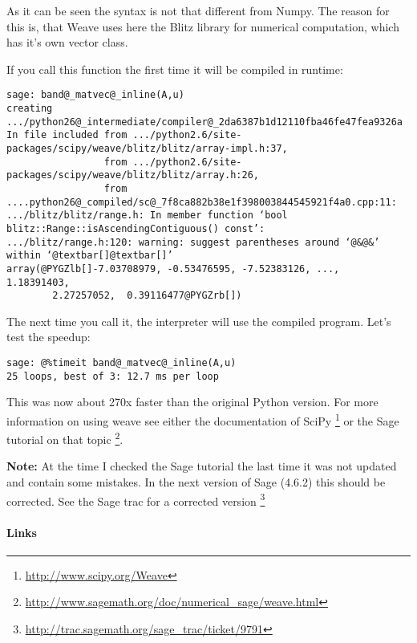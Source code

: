 \documentclass[letterpaper,10pt,english]{manual}
\begin{document}
As it can be seen the syntax is not that different from Numpy. The
reason for this is, that Weave uses here the Blitz library for
numerical computation, which has it's own vector class.

If you call this function the first time it will be compiled in
runtime:

\begin{Verbatim}[commandchars=@\[\]]
sage: band@_matvec@_inline(A,u)
creating .../python26@_intermediate/compiler@_2da6387b1d12110fba46fe47fea9326a
In file included from .../python2.6/site-packages/scipy/weave/blitz/blitz/array-impl.h:37,
                 from .../python2.6/site-packages/scipy/weave/blitz/blitz/array.h:26,
                 from ....python26@_compiled/sc@_7f8ca882b38e1f398003844545921f4a0.cpp:11:
.../blitz/blitz/range.h: In member function ‘bool blitz::Range::isAscendingContiguous() const’:
.../blitz/range.h:120: warning: suggest parentheses around ‘@&@&’ within ‘@textbar[]@textbar[]’
array(@PYGZlb[]-7.03708979, -0.53476595, -7.52383126, ...,  1.18391403,
        2.27257052,  0.39116477@PYGZrb[])
\end{Verbatim}

The next time you call it, the interpreter will use the compiled
program.
Let's test the speedup:

\begin{Verbatim}[commandchars=@\[\]]
sage: @%timeit band@_matvec@_inline(A,u)
25 loops, best of 3: 12.7 ms per loop
\end{Verbatim}

This was now about 270x faster than the original Python version.
For more information on using weave see either the documentation of
SciPy \footnote{
\href{http://www.scipy.org/Weave}{http://www.scipy.org/Weave}
} or the Sage tutorial on that topic \footnote{
\href{http://www.sagemath.org/doc/numerical\_sage/weave.html}{http://www.sagemath.org/doc/numerical\_sage/weave.html}
}.

\textbf{Note:} At the time I checked the Sage tutorial the last time
it was not updated and contain some mistakes. In the next version of
Sage (4.6.2) this should be corrected. See the Sage trac for a corrected
version \footnote{
\href{http://trac.sagemath.org/sage\_trac/ticket/9791}{http://trac.sagemath.org/sage\_trac/ticket/9791}
}
\paragraph{Links}

\resetcurrentobjects
\hypertarget{--doc-Cython}{}
\end{document}
